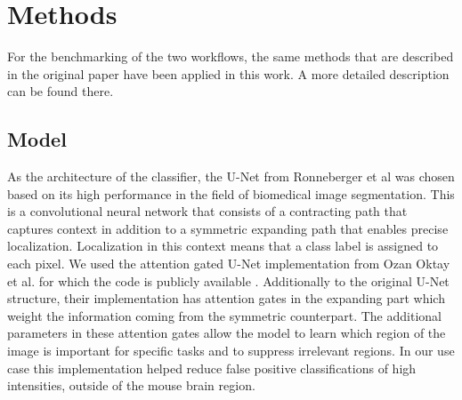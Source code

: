 \section{Methods}\label{sec:methods}
For the benchmarking of the two workflows, the same methods that are described in the original paper have been applied in this work.
A more detailed description can be found there.

\begin{sansmath}
\end{sansmath}

\subsection{Model}
As the architecture of the classifier, the U-Net from Ronneberger et al \cite{ronneberger_u-net:_2015} was chosen based on its high performance in the field of biomedical image segmentation.
This is a convolutional neural network that consists of a contracting path that captures context in addition to a symmetric expanding path that enables precise localization.
Localization in this context means that a class label is assigned to each pixel.
We used the attention gated U-Net implementation from Ozan Oktay et al. \cite{oktay_attention} for which the code is publicly available \cite{oktay_ozan-oktayattention-gated-networks_2020}.
Additionally to the original U-Net structure, their implementation has attention gates in the expanding part which weight the information coming from the symmetric counterpart.
The additional parameters in these attention gates allow the model to learn which region of the image is important for specific tasks and to suppress irrelevant regions.
In our use case this implementation helped reduce false positive classifications of high intensities, outside of the mouse brain region.

